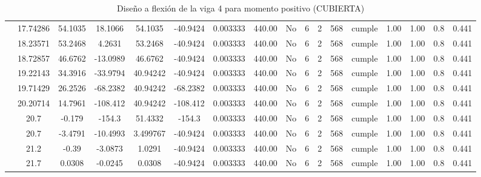 \begin{table}[H]
{\begin{tabular}{|c|c|c|c|c|c|c|c|c|c|c|c|c|c|c|c|c|}
\cline{2-17}    & 17.74286 & 54.1035 & 18.1066 & 54.1035 & -40.9424 & 0.003333 & 440.00 & No  & 6   & 2   & 568 & \cellcolor[rgb]{ .776,  .937,  .808}cumple & 1.00 & 1.00 & 0.8 & 0.441 \bigstrut\\
\cline{2-17}    & 18.23571 & 53.2468 & 4.2631 & 53.2468 & -40.9424 & 0.003333 & 440.00 & No  & 6   & 2   & 568 & \cellcolor[rgb]{ .776,  .937,  .808}cumple & 1.00 & 1.00 & 0.8 & 0.441 \bigstrut\\
\cline{2-17}    & 18.72857 & 46.6762 & -13.0989 & 46.6762 & -40.9424 & 0.003333 & 440.00 & No  & 6   & 2   & 568 & \cellcolor[rgb]{ .776,  .937,  .808}cumple & 1.00 & 1.00 & 0.8 & 0.441 \bigstrut\\
\cline{2-17}    & 19.22143 & 34.3916 & -33.9794 & 40.94242 & -40.9424 & 0.003333 & 440.00 & No  & 6   & 2   & 568 & \cellcolor[rgb]{ .776,  .937,  .808}cumple & 1.00 & 1.00 & 0.8 & 0.441 \bigstrut\\
\cline{2-17}    & 19.71429 & 26.2526 & -68.2382 & 40.94242 & -68.2382 & 0.003333 & 440.00 & No  & 6   & 2   & 568 & \cellcolor[rgb]{ .776,  .937,  .808}cumple & 1.00 & 1.00 & 0.8 & 0.441 \bigstrut\\
\cline{2-17}    & 20.20714 & 14.7961 & -108.412 & 40.94242 & -108.412 & 0.003333 & 440.00 & No  & 6   & 2   & 568 & \cellcolor[rgb]{ .776,  .937,  .808}cumple & 1.00 & 1.00 & 0.8 & 0.441 \bigstrut\\
\cline{2-17}    & 20.7 & -0.179 & -154.3 & 51.4332 & -154.3 & 0.003333 & 440.00 & No  & 6   & 2   & 568 & \cellcolor[rgb]{ .776,  .937,  .808}cumple & 1.00 & 1.00 & 0.8 & 0.441 \bigstrut\\
\cline{2-17}    & 20.7 & -3.4791 & -10.4993 & 3.499767 & -40.9424 & 0.003333 & 440.00 & No  & 6   & 2   & 568 & \cellcolor[rgb]{ .776,  .937,  .808}cumple & 1.00 & 1.00 & 0.8 & 0.441 \bigstrut\\
\cline{2-17}    & 21.2 & -0.39 & -3.0873 & 1.0291 & -40.9424 & 0.003333 & 440.00 & No  & 6   & 2   & 568 & \cellcolor[rgb]{ .776,  .937,  .808}cumple & 1.00 & 1.00 & 0.8 & 0.441 \bigstrut\\
\cline{2-17}    & 21.7 & 0.0308 & -0.0245 & 0.0308 & -40.9424 & 0.003333 & 440.00 & No  & 6   & 2   & 568 & \cellcolor[rgb]{ .776,  .937,  .808}cumple & 1.00 & 1.00 & 0.8 & 0.441 \bigstrut\\
\hline
\end{tabular}%



  }%
    \caption{Diseño a flexión de la viga 4 para momento positivo (CUBIERTA) }
  \label{tab:F VG4 CUB M+}%
\end{table}%
